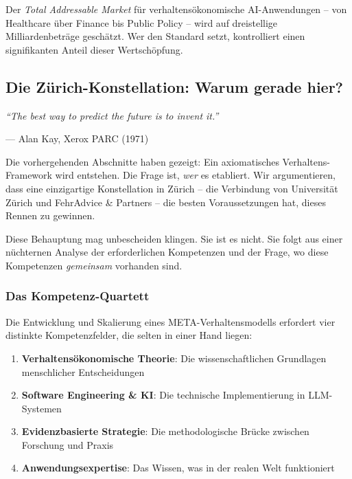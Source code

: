 Der \textit{Total Addressable Market} für verhaltensökonomische AI-Anwendungen -- von Healthcare über Finance bis Public Policy -- wird auf dreistellige Milliardenbeträge geschätzt. Wer den Standard setzt, kontrolliert einen signifikanten Anteil dieser Wertschöpfung.

\subsection{Die Zürich-Konstellation: Warum gerade hier?}

\epigraph{\textit{``The best way to predict the future is to invent it.''}}{--- Alan Kay, Xerox PARC (1971)}

Die vorhergehenden Abschnitte haben gezeigt: Ein axiomatisches Verhaltens-Framework wird entstehen. Die Frage ist, \textit{wer} es etabliert. Wir argumentieren, dass eine einzigartige Konstellation in Zürich -- die Verbindung von Universität Zürich und FehrAdvice \& Partners -- die besten Voraussetzungen hat, dieses Rennen zu gewinnen.

Diese Behauptung mag unbescheiden klingen. Sie ist es nicht. Sie folgt aus einer nüchternen Analyse der erforderlichen Kompetenzen und der Frage, wo diese Kompetenzen \textit{gemeinsam} vorhanden sind.

\subsubsection{Das Kompetenz-Quartett}

Die Entwicklung und Skalierung eines META-Verhaltensmodells erfordert vier distinkte Kompetenzfelder, die selten in einer Hand liegen:

\begin{enumerate}
    \item \textbf{Verhaltensökonomische Theorie}: Die wissenschaftlichen Grundlagen menschlicher Entscheidungen
    \item \textbf{Software Engineering \& KI}: Die technische Implementierung in LLM-Systemen
    \item \textbf{Evidenzbasierte Strategie}: Die methodologische Brücke zwischen Forschung und Praxis
    \item \textbf{Anwendungsexpertise}: Das Wissen, was in der realen Welt funktioniert
\end{enumerate}

